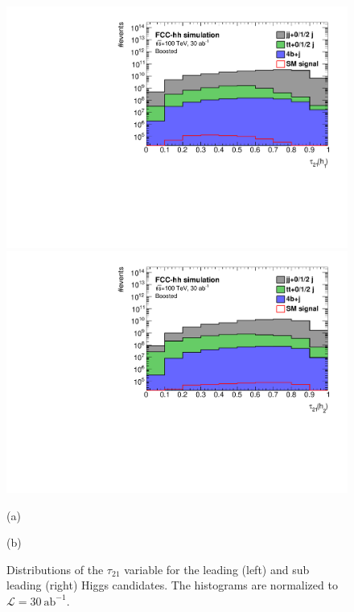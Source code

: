 \begin{figure}
	\centering
	\begin{minipage}{.5\textwidth}
		\centering
		\includegraphics[trim={.65cm 0 0 0},clip,width=\linewidth]{./Figures/hist_h1_tau21_stack.pdf}
	\end{minipage}%
	\begin{minipage}{.5\textwidth}
		\centering
		\includegraphics[trim={0 0 .65cm 0},clip,width=\linewidth]{./Figures/hist_h2_tau21_stack.pdf}
	\end{minipage}
	\begin{minipage}[t]{0.5\textwidth}
		\caption*{(a)}
	\end{minipage}%
	\hfill
	\begin{minipage}[t]{0.5\textwidth}
		\caption*{(b)}
	\end{minipage}
	\caption{Distributions of the $\tau_{21}$ variable for the leading (left) and sub leading (right) Higgs candidates. The histograms are normalized to $\mathcal{L}=30~\text{ab}^{-1}$.}
	\label{fig:sub_stack}
\end{figure} 


